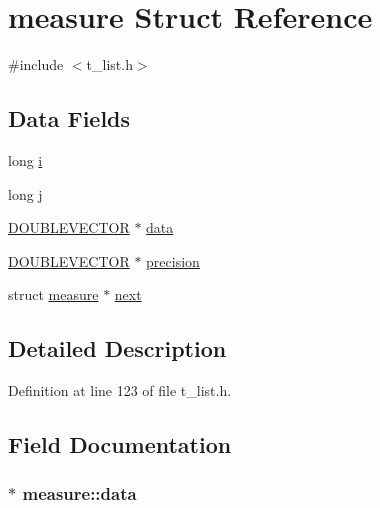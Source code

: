 \hypertarget{structmeasure}{\section{measure Struct Reference}
\label{structmeasure}
}


{\ttfamily \#include $<$t\-\_\-list.\-h$>$}

\subsection*{Data Fields}
\begin{DoxyCompactItemize}
\item 
long \hyperlink{structmeasure_a8b24769b181ee06450ae86ecec544ba5}{i}
\item 
long \hyperlink{structmeasure_af77ad1ea1d09744bf12b5f07b7440bdf}{j}
\item 
\hyperlink{struct_d_o_u_b_l_e_v_e_c_t_o_r}{D\-O\-U\-B\-L\-E\-V\-E\-C\-T\-O\-R} $\ast$ \hyperlink{structmeasure_a2c8bcf22c703d7af51ff57c7410c59ee}{data}
\item 
\hyperlink{struct_d_o_u_b_l_e_v_e_c_t_o_r}{D\-O\-U\-B\-L\-E\-V\-E\-C\-T\-O\-R} $\ast$ \hyperlink{structmeasure_a495cb36301c6d80b966c39989a1ab727}{precision}
\item 
struct \hyperlink{structmeasure}{measure} $\ast$ \hyperlink{structmeasure_a04b4b97618f4685a0a8be6c92898750b}{next}
\end{DoxyCompactItemize}


\subsection{Detailed Description}


Definition at line 123 of file t\-\_\-list.\-h.



\subsection{Field Documentation}
\hypertarget{structmeasure_a2c8bcf22c703d7af51ff57c7410c59ee}{
\subsubsection[{data}]{$\ast$ measure\-::data}}\label{structmeasure_a2c8bcf22c703d7af51ff57c7410c59ee}


